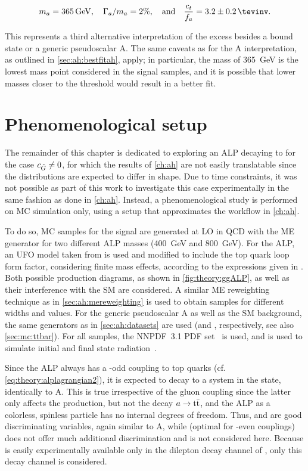 \begin{equation*}
    m_a = \SI{365}{\GeV}, \quad \Gamma_a / m_a = 2\%, \quad \text{and} \quad \frac{\ct}{f_a} = 3.2 \pm 0.2 \, \si{\tevinv}.
\end{equation*}

This represents a third alternative interpretation of the excess besides a \ttbar bound state or a generic pseudoscalar A. The same caveats as for the A interpretation, as outlined in \cref{sec:ah:bestfitah}, apply; in particular, the mass of \SI{365}{\GeV} is the lowest mass point considered in the signal samples, and it is possible that lower masses closer to the \ttbar threshold would result in a better fit.

\section{Phenomenological setup}
\label{sec:alps:setup}

The remainder of this chapter is dedicated to exploring an ALP decaying to \ttbar for the case $c_{\tilde{G}} \neq 0$, for which the results of \cref{ch:ah} are not easily translatable since the distributions are expected to differ in shape. Due to time constraints, it was not possible as part of this work to investigate this case experimentally in the same fashion as done in \cref{ch:ah}. Instead, a phenomenological study is performed on MC simulation only, using a setup that approximates the workflow in \cref{ch:ah}.

To do so, MC samples for the signal are generated at LO in QCD with the ME generator \amcatnlo for two different ALP masses (\SI{400}{\GeV} and \SI{800}{\GeV}). For the ALP, an UFO model taken from  is used and modified to include the top quark loop form factor, considering finite mass effects, according to the expressions given in . Both possible production diagrams, as shown in \cref{fig:theory:ggALP}, as well as their interference with the SM are considered. A similar ME reweighting technique as in \cref{sec:ah:mereweighting} is used to obtain samples for different widths and \cG values. For the generic pseudoscalar A as well as the SM \ttbar background, the same generators as in \cref{sec:ah:datasets} are used (\amcatnlo and \powhegvtwo, respectively, see also \cref{sec:mc:ttbar}). For all samples, the NNPDF~3.1 PDF set~\cite{NNPDF:2017mvq} is used, and  is used to simulate initial and final state radiation~\cite{Pythia:2015}.

Since the ALP always has a \CP-odd coupling to top quarks (cf. \cref{eq:theory:alplagrangian2}), it is expected to decay to a \ttbar system in the  state, identically to A. This is true irrespective of the gluon coupling \cG since the latter only affects the production, but not the decay $a \rightarrow \mathrm{t \bar{t}}$, and the ALP as a colorless, spinless particle has no internal degrees of freedom. Thus, \mtt and \chel are good discriminating variables, again similar to A, while \chan (optimal for \CP-even couplings) does not offer much additional discrimination and is not considered here. Because \chel is easily experimentally available only in the dilepton decay channel of \ttbar, only this decay channel is considered.


